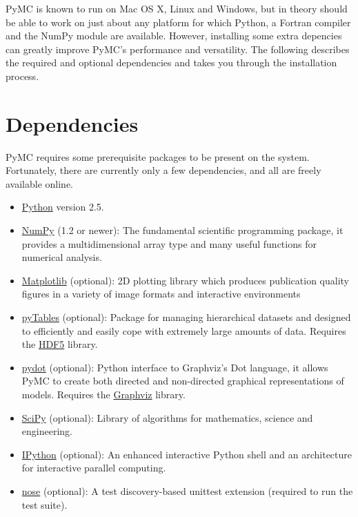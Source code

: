 


PyMC is known to run on Mac OS X, Linux and Windows, but in theory should be
able to work on just about any platform for which Python, a Fortran compiler
and the NumPy module are  available. However, installing some extra
depencies can greatly improve PyMC's performance and versatility.
The following describes the required and optional dependencies and takes you
through the installation process.



\hypertarget{dependencies}{}
\section{Dependencies}
\label{dependencies}

PyMC requires some prerequisite packages to be present on the system.
Fortunately, there are currently only a few dependencies, and all are
freely available online.
\begin{itemize}
\item {} 
\href{http://www.python.org/.}{Python} version 2.5.

\item {} 
\href{http://www.scipy.org/NumPy}{NumPy} (1.2 or newer): The fundamental scientific programming package, it provides a
multidimensional array type and many useful functions for numerical analysis.

\item {} 
\href{http://matplotlib.sourceforge.net/}{Matplotlib} (optional): 2D plotting library which produces publication
quality figures in a variety of image formats and interactive environments

\item {} 
\href{http://www.pytables.org/moin}{pyTables} (optional): Package for managing hierarchical datasets and
designed to efficiently and easily cope with extremely large amounts of data.
Requires the \href{http://www.hdfgroup.org/HDF5/}{HDF5} library.

\item {} 
\href{http://code.google.com/p/pydot/}{pydot} (optional): Python interface to Graphviz's Dot language, it allows
PyMC to create both directed and non-directed graphical representations of models.
Requires the \href{http://www.graphviz.org/}{Graphviz} library.

\item {} 
\href{http://www.scipy.org/}{SciPy} (optional): Library of algorithms for mathematics, science
and engineering.

\item {} 
\href{http://ipython.scipy.org/}{IPython} (optional): An enhanced interactive Python shell and an
architecture for interactive parallel computing.

\item {} 
\href{http://somethingaboutorange.com/mrl/projects/nose/}{nose} (optional): A test discovery-based unittest extension (required
to run the test suite).

\end{itemize}

